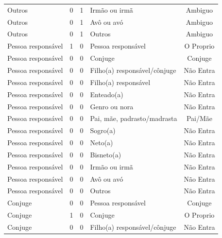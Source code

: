 \documentclass[
	12pt,				%
	openright,			%
	twoside,			%
	a4paper,			%
	english,			%
	french,				%
	spanish,			%
	brazil				%
	]{abntex2}
\begin{document}
\begin{anexosenv}
\begin{longtable}{@{}lcclc@{}}
Outros                       & 0         & 1        & Irmão ou irmã                & Ambiguo         \\
Outros                       & 0         & 1        & Avô ou avó                   & Ambiguo         \\
Outros                       & 0         & 1        & Outros                       & Ambiguo         \\
Pessoa responsável           & 1         & 0        & Pessoa responsável           & O Proprio       \\
Pessoa responsável           & 0         & 0        & Conjuge                      & Conjuge         \\
Pessoa responsável           & 0         & 0        & Filho(a) responsável/cônjuge & Não Entra       \\
Pessoa responsável           & 0         & 0        & Filho(a) responsável         & Não Entra       \\
Pessoa responsável           & 0         & 0        & Enteado(a)                   & Não Entra       \\
Pessoa responsável           & 0         & 0        & Genro ou nora                & Não Entra       \\
Pessoa responsável           & 0         & 0        & Pai, mãe, padrasto/madrasta  & Pai/Mãe         \\
Pessoa responsável           & 0         & 0        & Sogro(a)                     & Não Entra       \\
Pessoa responsável           & 0         & 0        & Neto(a)                      & Não Entra       \\
Pessoa responsável           & 0         & 0        & Bisneto(a)                   & Não Entra       \\
Pessoa responsável           & 0         & 0        & Irmão ou irmã                & Não Entra       \\
Pessoa responsável           & 0         & 0        & Avô ou avó                   & Não Entra       \\
Pessoa responsável           & 0         & 0        & Outros                       & Não Entra       \\
Conjuge                      & 0         & 0        & Pessoa responsável           & Conjuge         \\
Conjuge                      & 1         & 0        & Conjuge                      & O Proprio       \\
Conjuge                      & 0         & 0        & Filho(a) responsável/cônjuge & Não Entra       \\

\end{longtable}
\end{anexosenv}
\end{document}
